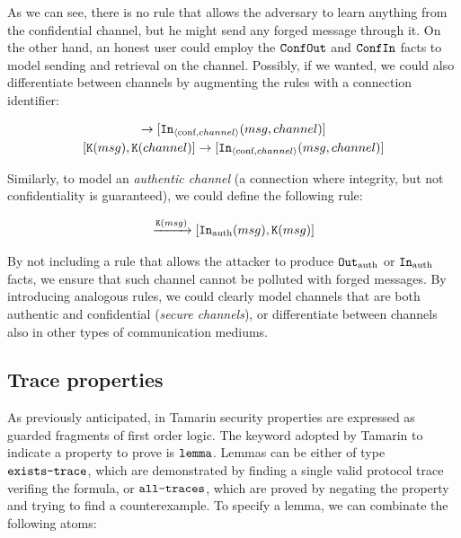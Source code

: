 \documentclass{article}
\newcommand{\mono}[1]{\textrm{\tt #1}}
\begin{document}
As we can see, there is no rule that allows the adversary to learn anything from the confidential channel, but he might send any forged message through it. On the other hand, an honest user could employ the $\mono{ConfOut}$ and $\mono{ConfIn}$ facts to model sending and retrieval on the channel. Possibly, if we wanted, we could also differentiate between channels by augmenting the rules with a connection identifier:

\begin{gather*}
    [\mono{Out}_{\langle \textrm{conf}, channel \rangle}(msg, channel)] \to [\mono{In}_{\langle \textrm{conf}, channel \rangle}(msg, channel)]\\
    [\mono{K}(msg), \mono{K}(channel)] \to [\mono{In}_{\langle \textrm{conf}, channel \rangle}(msg, channel)]
\end{gather*}

Similarly, to model an \textit{authentic channel} (a connection where integrity, but not confidentiality is guaranteed), we could define the following rule:

\begin{equation*}
    [\mono{Out}_{\textrm{auth}}(msg)] \xrightarrow{\mono{K}(msg)} [\mono{In}_{\textrm{auth}}(msg), \mono{K}(msg)]
\end{equation*}

By not including a rule that allows the attacker to produce $\mono{Out}_\textrm{auth}$ or $\mono{In}_\textrm{auth}$ facts, we ensure that such channel cannot be polluted with forged messages. By introducing analogous rules, we could clearly model channels that are both authentic and confidential (\textit{secure channels}), or differentiate between channels also in other types of communication mediums.

\subsection{Trace properties}\label{subsec:TraceProperties}

As previously anticipated, in Tamarin security properties are expressed as guarded fragments of first order logic. The keyword adopted by Tamarin to indicate a property to prove is $\mono{lemma}$. Lemmas can be either of type $\mono{exists-trace}$, which are demonstrated by finding a single valid protocol trace verifing the formula, or $\mono{all-traces}$, which are proved by negating the property and trying to find a counterexample. To specify a lemma, we can combinate the following atoms:
\end{document}
